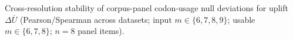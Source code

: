 Cross-resolution stability of corpus-panel codon-usage null deviations for uplift $\Delta\overline{U}$ (Pearson/Spearman across datasets; input $m\in\{6,7,8,9\}$; usable $m\in\{6,7,8\}$; $n=8$ panel items).
